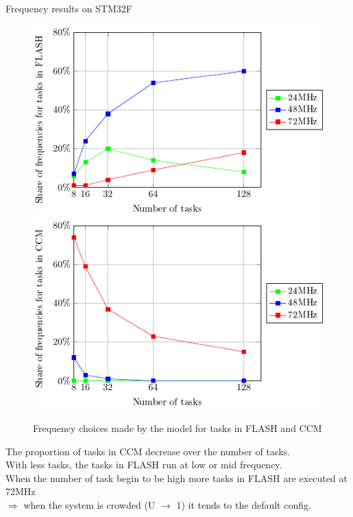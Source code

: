 \documentclass[
	11pt, %
]{beamer}
\begin{document}
\begin{frame}{Frequency results on STM32F}
	\begin{figure}
        \includegraphics[scale = 0.6]{data/model/frequency_choose.pdf}
		\includegraphics[scale = 0.6]{data/model/frequency_choose_CCM.pdf}
		\caption{Frequency choices made by the model for tasks in FLASH and CCM}
	\end{figure}
The proportion of tasks in CCM decrease over the number of tasks. \\
With less tasks, the tasks in FLASH run at low or mid frequency. \\
When the number of task begin to be high more tasks in FLASH are executed at 72MHz \\
$\Rightarrow $ when the system is crowded (U $\to$ 1) it tends to the default config.
\end{frame}
\end{document}
